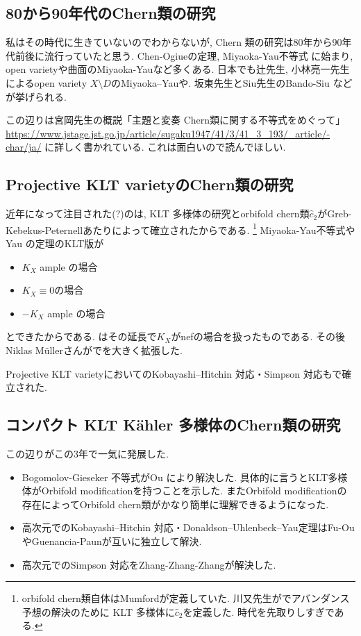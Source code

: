 \documentclass[dvipdfmx,a4paper,11pt]{article} %
\theoremstyle{definition}
\theoremstyle{remark}
\numberwithin{equation}{section}
\begin{document}
\subsection{80から90年代のChern類の研究}
私はその時代に生きていないのでわからないが, Chern 類の研究は80年から90年代前後に流行っていたと思う. 
Chen-Ogiueの定理\cite{CO75}, Miyaoka-Yau不等式\cite{Miy77}\cite{Yau77}
に始まり, open varietyや曲面のMiyaoka-Yauなど多くある. 
日本でも辻先生, 小林亮一先生によるopen variety $X \setminus D$のMiyaoka--Yauや. 
坂東先生とSiu先生のBando-Siu \cite{BS94}などが挙げられる.

この辺りは宮岡先生の概説「主題と変奏 Chern類に関する不等式をめぐって」
\url{https://www.jstage.jst.go.jp/article/sugaku1947/41/3/41_3_193/_article/-char/ja/}
に詳しく書かれている. 
これは面白いので読んでほしい. 

\subsection{Projective KLT varietyのChern類の研究}
近年になって注目された(?)のは, KLT 多様体の研究とorbifold chern類$\widehat{c}_2$がGreb-Kebekus-Peternellあたりによって確立されたからである. \footnote{orbifold chern類自体はMumfordが定義していた. 川又先生が\cite{Kaw92}でアバンダンス予想の解決のために KLT 多様体に$\widehat{c}_2$を定義した. 時代を先取りしすぎである.}
Miyaoka-Yau不等式やYau の定理のKLT版が
\begin{itemize}
\item $K_X$ ample の場合 \cite{GKPT19a, GKPT19b, GKPT19c}
\item $K_X \equiv 0$の場合 \cite{GKP16, LT18}
\item $-K_X$ ample の場合\cite{GKP22, DGP24}
\end{itemize}
とできたからである. 
\cite{IM22, IMM24}はその延長で$K_X$がnefの場合を扱ったものである. 
その後Niklas Müllerさんが\cite{Mul26}で\cite{IMM24}を大きく拡張した.

Projective KLT varietyにおいてのKobayashi--Hitchin 対応・Simpson 対応も\cite{GKPT19a, GKPT19b, GKPT19c}で確立された. 

\subsection{コンパクト KLT Kähler 多様体のChern類の研究}
この辺りがこの3年で一気に発展した. 
\begin{itemize}
\item Bogomolov-Gieseker 不等式がOu \cite{Ou24}により解決した. 具体的に言うとKLT多様体がOrbifold modificationを持つことを示した. またOrbifold modificationの存在によってOrbifold chern類がかなり簡単に理解できるようになった. 
\item 高次元でのKobayashi--Hitchin 対応・Donaldson--Uhlenbeck--Yau定理はFu-Ou\cite{FO25}やGuenancia-Paun\cite{GP26}が互いに独立して解決. 
\item 高次元でのSimpson 対応をZhang-Zhang-Zhang\cite{ZZZ26}が解決した.
\end{itemize}
\end{document}
